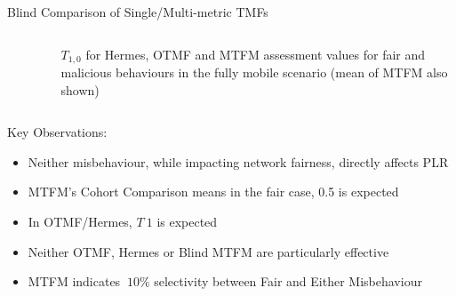 \documentclass{beamer}
\begin{document}
\begin{frame}[allowframebreaks,t]{Blind Comparison of Single/Multi-metric TMFs}
  \vspace{-24pt}%
  \begin{columns}
    \begin{column}[T]{0.5\textwidth}
      \begin{figure}[t]
        \centering
        \hfil
        \renewcommand{\thesubfigure}{c}%
        \label{fig:otmf_beta_comparison}
      \end{figure}%
    \end{column}
    \begin{column}[T]{0.5\textwidth}
      \begin{figure}[t]
        \centering
        \vspace{0pt}%
        \renewcommand{\thesubfigure}{b}%
        \label{fig:otmf_beta_comparison}
      \end{figure}
      $T_{1,0}$ for Hermes, OTMF and MTFM assessment values for fair and malicious behaviours in the fully mobile scenario (mean of MTFM also shown)

    \end{column}
  \end{columns}

  \framebreak

  Key Observations:
  \begin{itemize}
    \item Neither misbehaviour, while impacting network fairness, directly affects PLR
    \item MTFM's Cohort Comparison means in the fair case, 0.5 is expected
    \item In OTMF/Hermes, $T~1$ is expected
    \item Neither OTMF, Hermes or Blind MTFM are particularly effective
    \item MTFM indicates $~10\%$ selectivity between Fair and Either Misbehaviour
  \end{itemize}

\end{frame}
\end{document}
